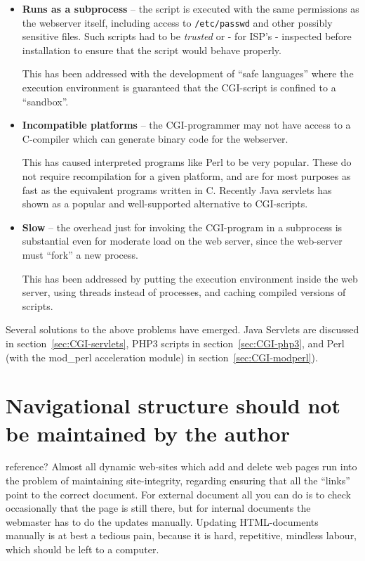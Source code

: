 \begin{itemize}
\item \textbf{Runs as a subprocess} -- the script is executed with the
  same permissions as the webserver itself, including access to
  \texttt{/etc/passwd} and other possibly sensitive files.  Such
  scripts had to be \textit{trusted} or - for ISP's - inspected before
  installation to ensure that the script would behave properly.

  This has been addressed with the development of ``safe languages''
  where the execution environment is guaranteed that the CGI-script is
  confined to a ``sandbox''.
  
\item \textbf{Incompatible platforms} -- the CGI-programmer may not
  have access to a C-compiler which can generate binary code for the
  webserver.

  This has caused interpreted programs like Perl to be very popular.  These do
  not require recompilation for a given platform, and are for most
  purposes as fast as the equivalent programs written in C.   Recently
  Java servlets has shown as a popular and well-supported alternative
  to CGI-scripts.
  
\item \textbf{Slow} -- the overhead just for invoking the CGI-program
  in a subprocess is substantial even for moderate load on the web
  server, since the web-server must ``fork'' a new process.

  This has been addressed by putting the execution environment inside
  the web server, using threads instead of processes, and caching
  compiled versions of scripts.  

\end{itemize}

Several solutions to the above problems have emerged.  Java Servlets
are discussed in section~\vref{sec:CGI-servlets},  PHP3 scripts in
section~\vref{sec:CGI-php3}, and Perl (with the mod\_perl
acceleration module) in section~\vref{sec:CGI-modperl}).

\section{Navigational structure should not be maintained by the author}

\textsf{reference?}  Almost all dynamic web-sites which add and delete
web pages run into the problem of maintaining site-integrity,
regarding ensuring that all the ``links'' point to the correct
document.    For external document all you can do is to check
occasionally that the page is still there, but for internal documents
the webmaster has to do the updates manually.  Updating HTML-documents
manually is at best a tedious pain, because it is hard, repetitive,
mindless labour, which should be left to a computer.

